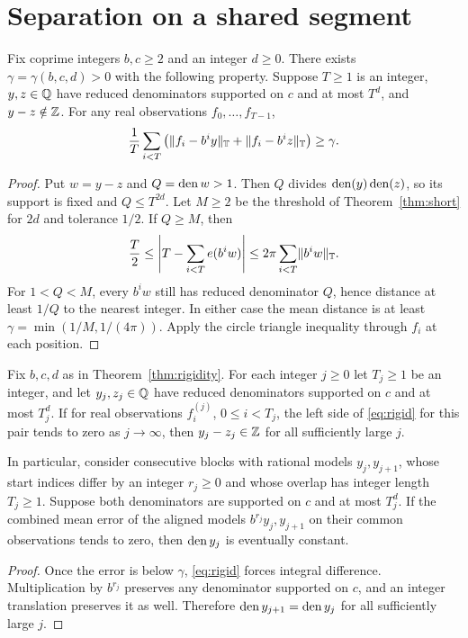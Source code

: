 \documentclass[11pt]{article}
\newcommand{\circabs}[1]{\lVert #1\rVert_{\T}}
\begin{document}
\section{Separation on a shared segment}\label{sec:rigidity}
\begin{theorem}\label{thm:rigidity}
Fix coprime integers \(b,c\ge2\) and an integer \(d\ge0\). There exists \(\gamma=\gamma(b,c,d)>0\) with the following property. Suppose \(T\ge1\) is an integer, \(y,z\in\mathbb Q\) have reduced denominators supported on \(c\) and at most \(T^d\), and \(y-z\notin\mathbb Z\). For any real observations \(f_0,\ldots,f_{T-1}\),
\begin{equation}\label{eq:rigid}
 \frac1T\sum_{i<T}\big(\circabs{f_i-b^iy}+\circabs{f_i-b^iz}\big)\ge\gamma .
\end{equation}
\end{theorem}
\begin{proof}
Put \(w=y-z\) and \(Q=\operatorname{den} w>1\). Then \(Q\) divides \(\operatorname{den}(y)\operatorname{den}(z)\), so its support is fixed and \(Q\le T^{2d}\). Let \(M\ge2\) be the threshold of Theorem~\ref{thm:short} for \(2d\) and tolerance \(1/2\). If \(Q\ge M\), then
\[
 \frac T2\le \left|T-\sum_{i<T}e(b^iw)\right|
      \le 2\pi\sum_{i<T}\circabs{b^iw}.
\]
For \(1<Q<M\), every \(b^iw\) still has reduced denominator \(Q\), hence distance at least \(1/Q\) to the nearest integer. In either case the mean distance is at least \(\gamma=\min(1/M,1/(4\pi))\). Apply the circle triangle inequality through \(f_i\) at each position.
\end{proof}

\begin{corollary}\label{cor:chain}
Fix \(b,c,d\) as in Theorem~\ref{thm:rigidity}. For each integer \(j\ge0\) let \(T_j\ge1\) be an integer, and let \(y_j,z_j\in\mathbb Q\) have reduced denominators supported on \(c\) and at most \(T_j^d\). If for real observations \(f^{(j)}_i\), \(0\le i<T_j\), the left side of \eqref{eq:rigid} for this pair tends to zero as \(j\to\infty\), then \(y_j-z_j\in\mathbb Z\) for all sufficiently large \(j\).

In particular, consider consecutive blocks with rational models \(y_j,y_{j+1}\), whose start indices differ by an integer \(r_j\ge0\) and whose overlap has integer length \(T_j\ge1\). Suppose both denominators are supported on \(c\) and at most \(T_j^d\). If the combined mean error of the aligned models \(b^{r_j}y_j,y_{j+1}\) on their common observations tends to zero, then \(\operatorname{den} y_j\) is eventually constant.
\end{corollary}
\begin{proof}
Once the error is below \(\gamma\), \eqref{eq:rigid} forces integral difference. Multiplication by \(b^{r_j}\) preserves any denominator supported on \(c\), and an integer translation preserves it as well. Therefore \(\operatorname{den} y_{j+1}=\operatorname{den} y_j\) for all sufficiently large \(j\).
\end{proof}
\end{document}
